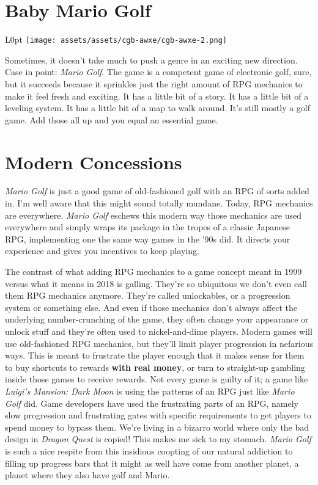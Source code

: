 \documentclass{book}
\begin{document}
\newpage\FloatBarrier\needspace{10mm}\section*{Baby Mario Golf}\nopagebreak[4]
\begin{wrapfigure}{L}{0pt} \texttt{[image: assets/assets/cgb-awxe/cgb-awxe-2.png]}\end{wrapfigure}
Sometimes, it doesn’t take much to push a genre in an exciting new direction. Case in point: \emph{Mario Golf}. The game is a competent game of electronic golf, sure, but it succeeds because it sprinkles just the right amount of RPG mechanics to make it feel fresh and exciting. It has a little bit of a story. It has a little bit of a leveling system. It has a little bit of a map to walk around. It’s still mostly a golf game. Add those all up and you equal an essential game.

\FloatBarrier\needspace{10mm}\section*{Modern Concessions}\nopagebreak[4]

\emph{Mario Golf} is just a good game of old-fashioned golf with an RPG of sorts added in. I’m well aware that this might sound totally mundane. Today, RPG mechanics are everywhere. \emph{Mario Golf} eschews this modern way those mechanics are used everywhere and simply wraps its package in the tropes of a classic Japanese RPG, implementing one the same way games in the ’90s did. It directs your experience and gives you incentives to keep playing.

The contrast of what adding RPG mechanics to a game concept meant in 1999 versus what it means in 2018 is galling. They’re so ubiquitous we don’t even call them RPG mechanics anymore. They’re called unlockables, or a progression system or something else. And even if those mechanics don’t always affect the underlying number-crunching of the game, they often change your appearance or unlock stuff and they’re often used to nickel-and-dime players. Modern games will use old-fashioned RPG mechanics, but they’ll limit player progression in nefarious ways. This is meant to frustrate the player enough that it makes sense for them to buy shortcuts to rewards \textbf{with real money}, or turn to straight-up gambling inside those games to receive rewards. Not every game is guilty of it; a game like \emph{Luigi’s Mansion: Dark Moon} is using the patterns of an RPG just like \emph{Mario Golf} did. Game developers have used the frustrating parts of an RPG, namely slow progression and frustrating gates with specific requirements to get players to spend money to bypass them. We’re living in a bizarro world where only the bad design in \emph{Dragon Quest} is copied! This makes me sick to my stomach. \emph{Mario Golf} is such a nice respite from this insidious coopting of our natural addiction to filling up progress bars that it might as well have come from another planet, a planet where they also have golf and Mario.
\end{document}
